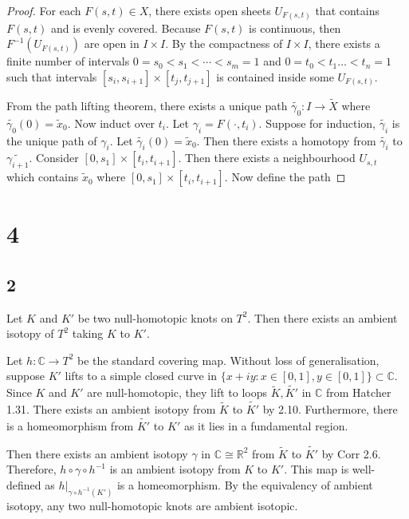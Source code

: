 \documentclass{article}
\theoremstyle{definition}
\numberwithin{theorem}{section}
\numberwithin{equation}{section}
\begin{document}
\begin{proof}
    For each $F(s, t) \in X$, there exists open sheets $U_{F(s, t)}$ that contains $F(s, t)$ and is evenly covered. Because $F(s, t)$ is continuous, then $F^{-1}(U_{F(s, t)})$ are open in $I \times I$. By the compactness of $I \times I$, there exists a finite number of intervals $0 = s_0 < s_1 < \cdots < s_m = 1$ and $0 = t_0 < t_1 \ldots < t_n = 1$ such that intervals $[s_i, s_{i + 1}] \times [t_j, t_{j + 1}]$ is contained inside some $U_{F(s,t)}$.

    From the path lifting theorem, there exists a unique path $\widetilde{\gamma_0} : I \rightarrow \tilde{X}$ where $\widetilde{\gamma_0}(0) = \tilde{x}_0$. Now induct over $t_i$. Let $\gamma_i = F(\cdot, t_i)$. Suppose for induction, $\widetilde{\gamma_i}$ is the unique path of $\gamma_i$. Let $\widetilde{\gamma_i}(0) = \tilde{x}_0$. Then there exists a homotopy from $\widetilde{\gamma_i}$ to $\widetilde{\gamma_{i + 1}}$. Consider $[0, s_1] \times [t_i, t_{i + 1}]$. Then there exists a neighbourhood $U_{s, t}$ which contains $ \tilde{x}_0$ where $[0, s_1] \times [t_i, t_{i + 1}]$. Now define the path 
\end{proof}

\section{4}
\subsection{2}
Let $K$ and $K'$ be two null-homotopic knots on $T^2$. Then there exists an ambient isotopy of $T^2$ taking $K$ to $K'$.

Let $h : \mathbb{C} \rightarrow T^2$ be the standard covering map.  Without loss of generalisation, suppose $K'$ lifts to a simple closed curve in $\{x + i y : x \in [0, 1], y \in [0, 1]\} \subset \mathbb{C}$. 
Since $K$ and $K'$ are null-homotopic, they lift to loops $\widetilde{K}, \widetilde{K'}$  in $\mathbb{C}$ from Hatcher 1.31. There exists an ambient isotopy from $\widetilde{K}$ to $\widetilde{K'}$ by 2.10. Furthermore, there is a homeomorphism from $\widetilde{K'}$ to $K'$ as it lies in a fundamental region.  

Then there exists an ambient isotopy $\gamma$ in $\mathbb{C} \cong \mathbb{R}^2$ from $\widetilde{K}$ to $\widetilde{K'}$ by Corr 2.6. Therefore, $h \circ \gamma \circ h^{-1}$ is an ambient isotopy from $K$ to $K'$. This map is well-defined as $h|_{\gamma \circ h^{-1}(K')}$ is a homeomorphism. By the equivalency of ambient isotopy, any two null-homotopic knots are ambient isotopic. 
\end{document}
